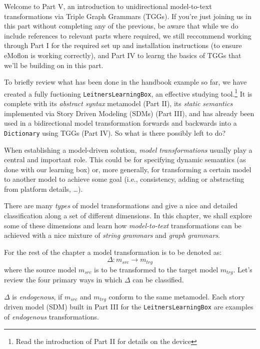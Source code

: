 \genHeader

Welcome to Part V, an introduction to unidirectional model-to-text transformations via Triple Graph Grammars (TGGs). If you're just joining us in this part
without completing any of the previous, be aware that while we do include references to relevant parts where required, we still reccommend working through Part
I for the required set up and installation instructions (to ensure eMoflon is working correctly), and Part IV to learng the basics of TGGs that we'll be
building on in this part.

To briefly review what has been done in the handbook example so far, we have created a fully fuctioning \texttt{LeitnersLearningBox}, an effective studying
tool.\footnote{Read the introduction of Part II for details on the device} It is complete with its \emph{abstract syntax} metamodel (Part II), its \emph{static
semantics} implemented via Story Driven Modeling (SDMs) (Part III), and has already been used in a bidirectional model transformation forwards and backwards
into a \texttt{Dictionary} using TGGs (Part IV). So what is there possibly left to do?

When establishing a model-driven solution, \emph{model transformations} usually play a central and important role. This could be
for specifying dynamic semantics (as done with our learning box) or, more generally, for transforming a certain model to another model to achieve some goal
(i.e., consistency, adding or abstracting from platform details, \ldots).

There are many \emph{types} of model transformations and \cite{CH03,Mens_Gorp_2006} give a nice and detailed classification along a set of different
dimensions. In this chapter, we shall explore some of these dimensions and learn how \emph{model-to-text}
transformations can be achieved with a nice mixture of \emph{string grammars} and \emph{graph grammars}.

For the rest of the chapter a model transformation is to be denoted as:
\begin{displaymath}
 	\Delta: m_{src} \rightarrow m_{trg}
\end{displaymath}
where the source model $m_{src}$ is to be transformed to the target model $m_{trg}$. Let's review the four primary ways in which $\Delta$ can be classified.

$\Delta$ is \emph{endogenous}, if $m_{src}$ and $m_{trg}$ conform to the same metamodel. Each story driven model (SDM) built in Part III for
the \texttt{LeitnersLearningBox} are examples of \emph{endogenous} transformations.

